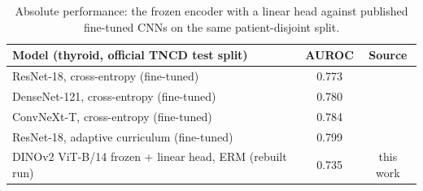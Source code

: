 \begin{table}[H]\centering\scriptsize
\caption{Absolute performance: the frozen encoder with a linear head against published fine-tuned CNNs on the same patient-disjoint split.}\label{tab:lit}
\begin{tabular}{lcc}\toprule
Model (thyroid, official TNCD test split) & AUROC & Source \\\midrule
ResNet-18, cross-entropy (fine-tuned) & 0.773 & \citet{gong2022acl} \\
DenseNet-121, cross-entropy (fine-tuned) & 0.780 & \citet{gong2022acl} \\
ConvNeXt-T, cross-entropy (fine-tuned) & 0.784 & \citet{gong2022acl} \\
ResNet-18, adaptive curriculum (fine-tuned) & 0.799 & \citet{gong2022acl} \\
DINOv2 ViT-B/14 frozen + linear head, ERM (rebuilt run) & 0.735 & this work \\
\bottomrule\end{tabular}
\end{table}
